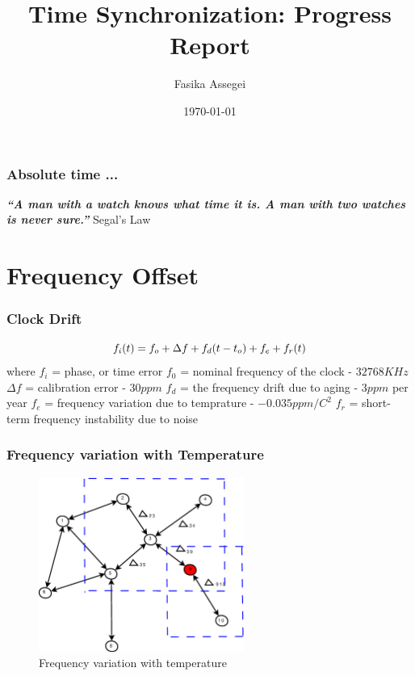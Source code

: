 \documentclass[t]{beamer}
\title{Time Synchronization: Progress Report}
\author{Fasika Assegei}
\date{\today}
\begin{document}
\begin{frame}
\titlepage
\end{frame}
\begin{frame}
\frametitle{Absolute time ...} \centering
 \textbf{\textit{``A man with a watch knows what time it is. A man with two watches is never sure.''}
}
\newline
Segal's Law
\begin{figure}
\centering
\end{figure}
\end{frame}


\frame{\tableofcontents}

\section{Frequency Offset}

\begin{frame}
    \frametitle{Clock Drift}
   \begin{equation}
    \centering
f_i(t) = f_o + \Delta f + f_d(t-t_o) + f_e + f_r(t)
\end{equation}
where\newline
      $f_i$ = phase, or time error \newline
      $f_0$ = nominal frequency of the clock - $32768KHz$ \newline
      $\Delta f$ = calibration error - $30 ppm$ \newline
      $f_d$ = the frequency drift due to aging - $3ppm$ per year \newline
      $f_e$ = frequency variation due to temprature - $-0.035ppm/C^2$ \newline
      $f_r$ = short-term frequency instability due to noise \newline
\end{frame}

\begin{frame}
\frametitle{Frequency variation with Temperature}
 \begin{figure}
  \includegraphics[width=0.6\textwidth]{clock_temp}
  \caption{Frequency variation with temperature}
 \end{figure}
\end{frame}
\end{document}

